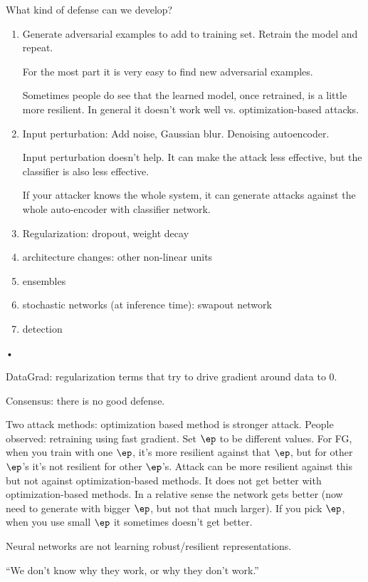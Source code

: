 What kind of defense can we develop? 
\begin{enumerate}
\item
Generate adversarial examples to add to training set.
Retrain the model and repeat.

For the most part it is very easy to find new adversarial examples.  

Sometimes people do see that the learned model, once retrained, is a little more resilient. In general it doesn't work well vs. optimization-based attacks.
\item
Input perturbation: Add noise, Gaussian blur. Denoising autoencoder. 

Input perturbation doesn't help. It can make the attack less effective, but the classifier is also less effective.

If your attacker knows the whole system, it can generate attacks against the whole auto-encoder with classifier network.
\item
Regularization: dropout, weight decay
\item
architecture changes: other non-linear units
\item
ensembles%
\item
stochastic networks (at inference time): swapout network
\item
detection
\end{enumerate}•

DataGrad: regularization terms that try to drive gradient around data to 0.

Consensus: there is no good defense.

Two attack methods: optimization based method is stronger attack. People observed: retraining using fast gradient. Set $\ep$ to be different values. For FG, when you train with one $\ep$, it's more resilient against that $\ep$, but for other $\ep$'s it's not resilient for other $\ep$'s. Attack can be more resilient against this but not against optimization-based methods. It does not get better with optimization-based methods.
In a relative sense the network gets better (now need to generate with bigger $\ep$, but not that much larger). If you pick $\ep$, when you use small $\ep$ it sometimes doesn't get better.


Neural networks are not learning robust/resilient representations.

``We don't know why they work, or why they don't work.''

